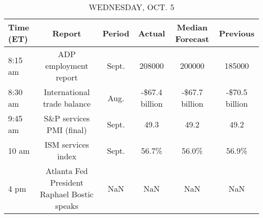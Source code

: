 \documentclass{article}%
\begin{document}
%


\begin{table}[htbp]%
\caption{WEDNESDAY, OCT. 5}%
\centering%
\begin{adjustbox}{width=1\textwidth}%
\begin{tabular}{lccccc}
\toprule
Time (ET) &                                      Report & Period &         Actual & Median Forecast &       Previous \\
\midrule
  8:15 am &                       ADP employment report &  Sept. &         208000 &          200000 &         185000 \\
  8:30 am &                 International trade balance &   Aug. & -\$67.4 billion &  -\$67.7 billion & -\$70.5 billion \\
  9:45 am &                    S\&P services PMI (final) &  Sept. &           49.3 &            49.2 &           49.2 \\
    10 am &                          ISM services index &  Sept. &          56.7\% &           56.0\% &          56.9\% \\
     4 pm & Atlanta Fed President Raphael Bostic speaks &    NaN &            NaN &             NaN &            NaN \\
\bottomrule
\end{tabular}
%
\end{adjustbox}%
\end{table}

%
\end{document}
